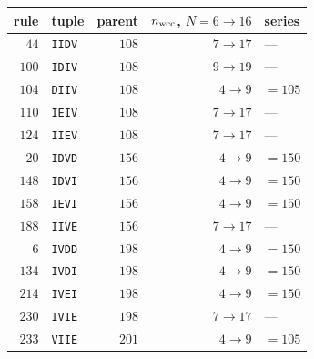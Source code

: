 \begin{tabular}{rlrrl}
\hline
rule & tuple & parent & $n_{\rm wcc}$, $N{=}6\!\to\!16$ & series \\
\hline
$44$ & \texttt{IIDV} & $108$ & $7\!\to\!17$ & --- \\
$100$ & \texttt{IDIV} & $108$ & $9\!\to\!19$ & --- \\
$104$ & \texttt{DIIV} & $108$ & $4\!\to\!9$ & $=105$ \\
$110$ & \texttt{IEIV} & $108$ & $7\!\to\!17$ & --- \\
$124$ & \texttt{IIEV} & $108$ & $7\!\to\!17$ & --- \\
$20$ & \texttt{IDVD} & $156$ & $4\!\to\!9$ & $=150$ \\
$148$ & \texttt{IDVI} & $156$ & $4\!\to\!9$ & $=150$ \\
$158$ & \texttt{IEVI} & $156$ & $4\!\to\!9$ & $=150$ \\
$188$ & \texttt{IIVE} & $156$ & $7\!\to\!17$ & --- \\
$6$ & \texttt{IVDD} & $198$ & $4\!\to\!9$ & $=150$ \\
$134$ & \texttt{IVDI} & $198$ & $4\!\to\!9$ & $=150$ \\
$214$ & \texttt{IVEI} & $198$ & $4\!\to\!9$ & $=150$ \\
$230$ & \texttt{IVIE} & $198$ & $7\!\to\!17$ & --- \\
$233$ & \texttt{VIIE} & $201$ & $4\!\to\!9$ & $=105$ \\
\hline
\end{tabular}
